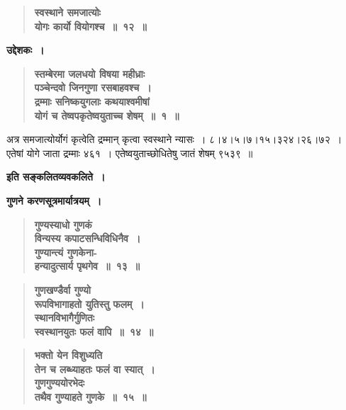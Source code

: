 \documentclass[11pt, openany]{book}
\begin{document}
 \label{1.12}
\begin{quote}
{\large \textbf{{\color{purple}स्वस्थाने समजात्योः \\
योगः कार्यो वियोगश्च~॥~१२~॥}}}
\end{quote}

\newpage

\noindent \textbf{उद्देशकः~।}

 \label{Ex 1.1}
\begin{quote}
\textbf{{\color{red}स्तम्बेरमा जलधयो विषया महीध्राः\\ 
पञ्चेन्दवो जिनगुणा रसबाहवश्च~।\\
द्रम्माः सनिष्कयुगलाः कथयाश्वमीषां \\
योगं च तेष्वपकृतेष्वयुताच्च शेषम्~॥~१~॥}}
\end{quote}

अत्र समजात्योर्योगं कृत्वेति द्रम्मान् कृत्वा स्वस्थाने न्यासः~। ८।४।५।७।१५।३२४।२६।७२~।\\

एतेषां योगे जाता द्रम्माः ४६१~। एतेष्वयुताच्छोधितेषु जातं शेषम् ९५३९~॥
\vspace{2mm}

\begin{center}
\textbf{इति सङ्कलितव्यवकलिते~।}\\
\vspace{8mm}

\textbf{गुणने करणसूत्रमार्यात्रयम्~।}
\end{center}

 \label{1.13}
\begin{quote}
{\large \textbf{{\color{purple}गुण्यस्याधो गुणकं \\
विन्यस्य कपाटसन्धिविधिनैव~।\\ 
गुण्यान्त्यं गुणकेना-\\
हन्यादुत्सार्य पृथगेव~॥~१३~॥}}}
\end{quote}
\vspace{-8mm}

 \label{1.14}
\begin{quote}
{\large \textbf{{\color{purple}गुणखण्डैर्वा गुण्यो \\
रूपविभागाहतो युतिस्तु फलम्~।\\ 
स्थानविभागैर्गुणितः \\
स्वस्थानयुतः फलं वापि~॥~१४~॥}}}
\end{quote}
\vspace{-8mm}

 \label{1.15}
\begin{quote}
{\large \textbf{{\color{purple}भक्तो येन विशुध्यति \\
तेन च लब्ध्याहतः फलं वा स्यात्~।\\ 
गुणगुण्ययोरभेदः \\
तथैव गुण्याहते गुणके~॥~१५~॥}}}
\end{quote}
\end{document}
